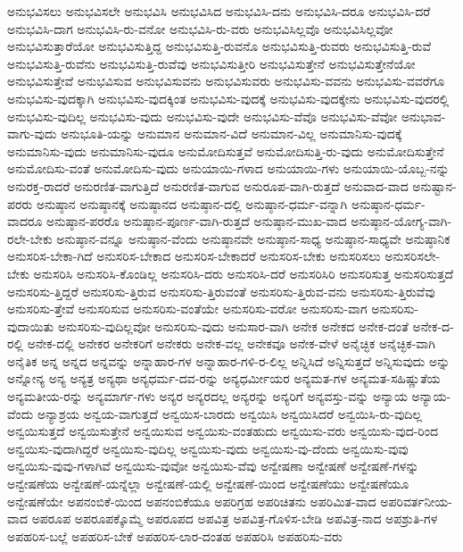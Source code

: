 {ಅನುಭವಿಸಲು
ಅನುಭವಿಸಲೇ
ಅನುಭವಿಸಿ
ಅನುಭವಿಸಿದ
ಅನುಭವಿಸಿ-ದನು
ಅನುಭವಿಸಿ-ದರೂ
ಅನುಭವಿಸಿ-ದರೆ
ಅನುಭವಿಸಿ-ದಾಗ
ಅನುಭವಿಸಿ-ರು-ವನೋ
ಅನುಭವಿಸಿ-ರು-ವರು
ಅನುಭವಿಸಿಲ್ಲವೊ
ಅನುಭವಿಸಿಲ್ಲವೋ
ಅನುಭವಿಸುತ್ತಾರೆಯೋ
ಅನುಭವಿಸುತ್ತಿದ್ದ
ಅನುಭವಿಸುತ್ತಿ-ರುವನೊ
ಅನುಭವಿಸುತ್ತಿ-ರುವರು
ಅನುಭವಿಸುತ್ತಿ-ರುವೆ
ಅನುಭವಿಸುತ್ತಿ-ರುವೆನು
ಅನುಭವಿಸುತ್ತಿ-ರುವೆವು
ಅನುಭವಿಸುತ್ತೀರಿ
ಅನುಭವಿಸುತ್ತೇನೆ
ಅನುಭವಿಸುತ್ತೇನೆಯೋ
ಅನುಭವಿಸುತ್ತೇವೆ
ಅನುಭವಿಸುವ
ಅನುಭವಿಸುವನು
ಅನುಭವಿಸುವರು
ಅನುಭವಿಸು-ವವನು
ಅನುಭವಿಸು-ವವರೆಗೂ
ಅನುಭವಿಸು-ವುದಕ್ಕಾಗಿ
ಅನುಭವಿಸು-ವುದಕ್ಕಿಂತ
ಅನುಭವಿಸು-ವುದಕ್ಕೆ
ಅನುಭವಿಸು-ವುದಕ್ಕೇನು
ಅನುಭವಿಸು-ವುದರಲ್ಲಿ
ಅನುಭವಿಸು-ವುದಿಲ್ಲ
ಅನುಭವಿಸು-ವುದು
ಅನುಭವಿಸು-ವುದೇ
ಅನುಭವಿಸು-ವೆವೊ
ಅನುಭವಿಸು-ವೆವೋ
ಅನುಭಾವ-ವಾಗು-ವುದು
ಅನುಭೂತಿ-ಯನ್ನು
ಅನುಮಾನ
ಅನುಮಾನ-ವಿದೆ
ಅನುಮಾನ-ವಿಲ್ಲ
ಅನುಮಾನಿಸು-ವುದಕ್ಕೆ
ಅನುಮಾನಿಸು-ವುದು
ಅನುಮಾನಿಸು-ವುದೂ
ಅನುಮೋದಿಸುತ್ತವೆ
ಅನುಮೋದಿಸುತ್ತಿ-ರು-ವುದು
ಅನುಮೋದಿಸುತ್ತೇನೆ
ಅನುಮೋದಿಸು-ವಂತೆ
ಅನುಮೋದಿಸು-ವುದು
ಅನುಯಾಯಿ-ಗಳಾದ
ಅನುಯಾಯಿ-ಗಳು
ಅನುಯಾಯಿ-ಯೊಬ್ಬ-ನನ್ನು
ಅನುರಕ್ತ-ರಾದರೆ
ಅನುರಣಿತ-ವಾಗುತ್ತಿದೆ
ಅನುರಣಿತ-ವಾಗುವ
ಅನುರೂಪ-ವಾಗಿ-ರುತ್ತದೆ
ಅನುವಾದ-ವಾದ
ಅನುಷ್ಟಾನ-ಪರರು
ಅನುಷ್ಠಾನ
ಅನುಷ್ಠಾನಕ್ಕೆ
ಅನುಷ್ಠಾನದ
ಅನುಷ್ಠಾನ-ದಲ್ಲಿ
ಅನುಷ್ಠಾನ-ಧರ್ಮ-ವನ್ನಾಗಿ
ಅನುಷ್ಠಾನ-ಧರ್ಮ-ವಾದರೂ
ಅನುಷ್ಠಾನ-ಪರರೊ
ಅನುಷ್ಠಾನ-ಪೂರ್ಣ-ವಾಗಿ-ರುತ್ತದೆ
ಅನುಷ್ಠಾನ-ಮುಖ-ವಾದ
ಅನುಷ್ಠಾನ-ಯೋಗ್ಯ-ವಾಗಿ-ರಲೇ-ಬೇಕು
ಅನುಷ್ಠಾನ-ವನ್ನೂ
ಅನುಷ್ಠಾನ-ವೆಂದು
ಅನುಷ್ಠಾನವೇ
ಅನುಷ್ಠಾನ-ಸಾಧ್ಯ
ಅನುಷ್ಠಾನ-ಸಾಧ್ಯವೇ
ಅನುಷ್ಠಾನಿಕ
ಅನುಸರಿಸ-ಬೇಕಾ-ಗಿದೆ
ಅನುಸರಿಸ-ಬೇಕಾದ
ಅನುಸರಿಸ-ಬೇಕಾದರೆ
ಅನುಸರಿಸ-ಬೇಕು
ಅನುಸರಿಸಲು
ಅನುಸರಿಸಲೇ-ಬೇಕು
ಅನುಸರಿಸಿ
ಅನುಸರಿಸಿ-ಕೊಂಡಿಲ್ಲ
ಅನುಸರಿಸಿ-ದರು
ಅನುಸರಿಸಿ-ದರೆ
ಅನುಸರಿಸಿರಿ
ಅನುಸರಿಸುತ್ತ
ಅನುಸರಿಸುತ್ತದೆ
ಅನುಸರಿಸು-ತ್ತಿದ್ದರೆ
ಅನುಸರಿಸು-ತ್ತಿರುವ
ಅನುಸರಿಸು-ತ್ತಿರುವಂತೆ
ಅನುಸರಿಸು-ತ್ತಿರುವ-ವನು
ಅನುಸರಿಸು-ತ್ತಿರುವೆವು
ಅನುಸರಿಸು-ತ್ತೇವೆ
ಅನುಸರಿಸುವ
ಅನುಸರಿಸು-ವಂತೆಯೇ
ಅನುಸರಿಸು-ವರೋ
ಅನುಸರಿಸು-ವಾಗ
ಅನುಸರಿಸು-ವುದಾಯಿತು
ಅನುಸರಿಸು-ವುದಿಲ್ಲವೋ
ಅನುಸರಿಸು-ವುದು
ಅನುಸಾರ-ವಾಗಿ
ಅನೇಕ
ಅನೇಕದ
ಅನೇಕ-ದಂತೆ
ಅನೇಕ-ದ-ರಲ್ಲಿ
ಅನೇಕ-ದಲ್ಲಿ
ಅನೇಕರ
ಅನೇಕರಿಗೆ
ಅನೇಕರು
ಅನೇಕ-ವಲ್ಲ
ಅನೇಕವೂ
ಅನೇಕ-ವೇಳೆ
ಅನೈಚ್ಛಿಕ
ಅನೈಚ್ಛಿಕ-ವಾಗಿ
ಅನೈತಿಕ
ಅನ್ನ
ಅನ್ನದ
ಅನ್ನವನ್ನು
ಅನ್ನಾಹಾರ-ಗಳ
ಅನ್ನಾಹಾರ-ಗಳಿ-ರ-ಲಿಲ್ಲ
ಅನ್ನಿಸಿದೆ
ಅನ್ನಿಸುತ್ತದೆ
ಅನ್ನಿಸುವುದು
ಅನ್ನು
ಅನ್ನೋನ್ಯ
ಅನ್ಯ
ಅನ್ಯತ್ರ
ಅನ್ಯಥಾ
ಅನ್ಯಧರ್ಮ-ದವ-ರನ್ನು
ಅನ್ಯಧರ್ಮೀಯರ
ಅನ್ಯಮತ-ಗಳ
ಅನ್ಯಮತ-ಸಹಿಷ್ಣುತೆಯ
ಅನ್ಯಮತೀಯ-ರನ್ನು
ಅನ್ಯಮಾರ್ಗ-ಗಳು
ಅನ್ಯರ
ಅನ್ಯರದಲ್ಲ
ಅನ್ಯರನ್ನು
ಅನ್ಯರಿಗೆ
ಅನ್ಯವಸ್ತು-ವನ್ನು
ಅನ್ಯಾಯ
ಅನ್ಯಾಯ-ವೆಂದು
ಅನ್ಯಾಶ್ರಯ
ಅನ್ವಯ-ವಾಗುತ್ತದೆ
ಅನ್ವಯಿಸ-ಬಾರದು
ಅನ್ವಯಿಸಿ
ಅನ್ವಯಿಸಿದರೆ
ಅನ್ವಯಿಸಿ-ರು-ವುದಿಲ್ಲ
ಅನ್ವಯಿಸುತ್ತದೆ
ಅನ್ವಯಿಸುತ್ತೇನೆ
ಅನ್ವಯಿಸುವ
ಅನ್ವಯಿಸು-ವಂತಹುದು
ಅನ್ವಯಿಸು-ವರು
ಅನ್ವಯಿಸು-ವುದ-ರಿಂದ
ಅನ್ವಯಿಸು-ವುದಾಗಿದ್ದರೆ
ಅನ್ವಯಿಸು-ವುದಿಲ್ಲ
ಅನ್ವಯಿಸು-ವುದು
ಅನ್ವಯಿಸು-ವು-ದೆಂದು
ಅನ್ವಯಿಸು-ವುವು
ಅನ್ವಯಿಸು-ವುವು-ಗಳಾಗಿವೆ
ಅನ್ವಯಿಸು-ವುವೋ
ಅನ್ವಯಿಸು-ವೆವು
ಅನ್ವೇಷಣಾ
ಅನ್ವೇಷಣೆ
ಅನ್ವೇಷಣೆ-ಗಳನ್ನು
ಅನ್ವೇಷಣೆಯ
ಅನ್ವೇಷಣೆ-ಯನ್ನೆಲ್ಲಾ
ಅನ್ವೇಷಣೆ-ಯಲ್ಲಿ
ಅನ್ವೇಷಣೆ-ಯಿಂದ
ಅನ್ವೇಷಣೆಯು
ಅನ್ವೇಷಣೆಯೂ
ಅನ್ವೇಷಣೆಯೇ
ಅಪನಂಬಿಕೆ-ಯಿಂದ
ಅಪನಂಬಿಕೆಯೂ
ಅಪರಿಗ್ರಹ
ಅಪರಿಚಿತನು
ಅಪರಿಮಿತ-ವಾದ
ಅಪರಿವರ್ತನೀಯ-ವಾದ
ಅಪರೂಪ
ಅಪರೂಪಕ್ಕೊಮ್ಮೆ
ಅಪರೂಪದ
ಅಪವಿತ್ರ
ಅಪವಿತ್ರ-ಗೊಳಿಸ-ಬೇಡಿ
ಅಪವಿತ್ರ-ನಾದ
ಅಪಶ್ರುತಿ-ಗಳ
ಅಪಹರಿಸ-ಬಲ್ಲೆ
ಅಪಹರಿಸ-ಬೇಕೆ
ಅಪಹರಿಸ-ಲಾರ-ದಂತಹ
ಅಪಹರಿಸಿ
ಅಪಹರಿಸು-ವರು
}
